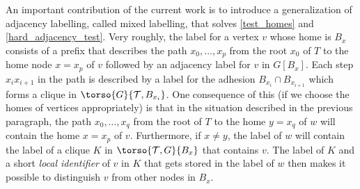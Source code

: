 An important contribution of the current work is to introduce a generalization of adjacency labelling, called mixed labelling, that solves \ref{test_homes} and \ref{hard_adjacency_test}. Very roughly, the label for a vertex $v$ whose home is $B_x$ consists of a prefix that describes the path $x_0,\ldots,x_p$ from the root $x_0$ of $T$ to the home node $x=x_p$ of $v$ followed by an adjacency label for $v$ in $G[B_x]$.  Each step $x_{i}x_{i+1}$ in the path is described by a label for the adhesion $B_{x_i}\cap B_{x_{i+1}}$ which forms a clique in $\torso{G}{\mathcal{T},B_{x_i}}$.  One consequence of this (if we choose the homes of vertices appropriately) is that in the situation described in the previous paragraph, the path $x_0,\ldots,x_q$ from the root of $T$ to the home $y=x_q$ of $w$ will contain the home $x=x_p$ of $v$.  Furthermore, if $x\neq y$, the label of $w$ will contain the label of a clique $K$ in $\torso{\mathcal{T},G}{B_x}$ that contains $v$.  The label of $K$ and a short \emph{local identifier} of $v$ in $K$ that gets stored in the label of $w$ then makes it possible to distinguish $v$ from other nodes in $B_x$.  
 


